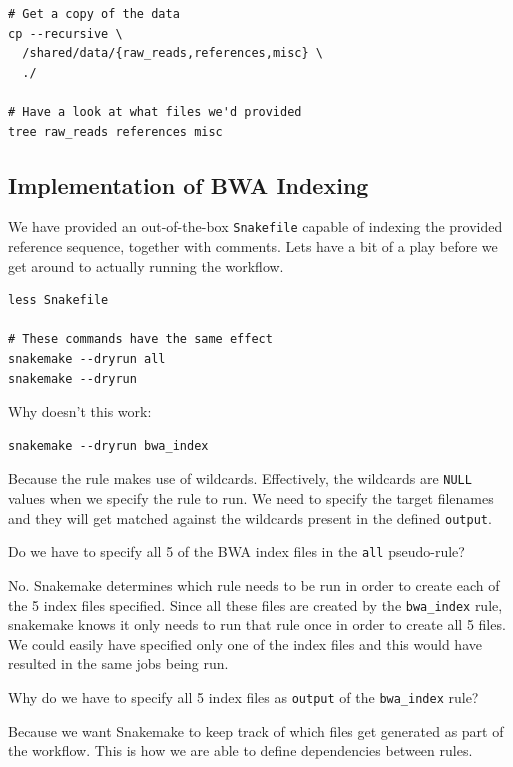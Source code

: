 \begin{lstlisting}
# Get a copy of the data
cp --recursive \
  /shared/data/{raw_reads,references,misc} \
  ./

# Have a look at what files we'd provided
tree raw_reads references misc
\end{lstlisting}

\subsection{Implementation of BWA Indexing}

We have provided an out-of-the-box \texttt{Snakefile} capable of indexing the provided reference sequence, together with comments. Lets
have a bit of a play before we get around to actually running the workflow.

\begin{lstlisting}
less Snakefile

# These commands have the same effect
snakemake --dryrun all
snakemake --dryrun
\end{lstlisting}


\begin{questions}

Why doesn't this work:

\begin{lstlisting}
snakemake --dryrun bwa_index
\end{lstlisting}

\begin{answer}

Because the rule makes use of wildcards. Effectively, the wildcards are \texttt{NULL} values when
we specify the rule to run. We need to specify the target filenames and they will get matched against
the wildcards present in the defined \texttt{output}.

\end{answer}

Do we have to specify all 5 of the BWA index files in the \texttt{all} pseudo-rule?

\begin{answer}

No. Snakemake determines which rule needs to be run in order to create each of the 5 index files specified. Since all these files
are created by the \texttt{bwa\_index} rule, snakemake knows it only needs to run that rule once in order to create all 5 files.
We could easily have specified only one of the index files and this would have resulted in the same jobs being run.

\end{answer}

Why do we have to specify all 5 index files as \texttt{output} of the \texttt{bwa\_index} rule?

\begin{answer}

Because we want Snakemake to keep track of which files get generated as part of the workflow. This is how we are able to define
dependencies between rules.

\end{answer}

\end{questions}


